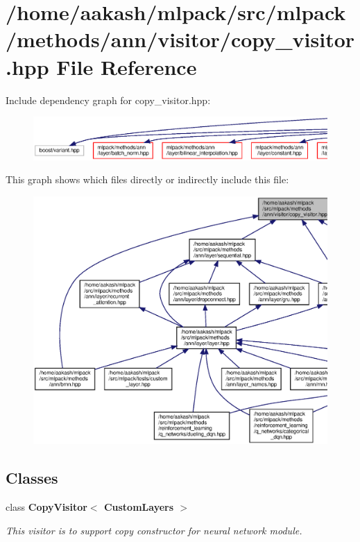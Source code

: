 \section{/home/aakash/mlpack/src/mlpack/methods/ann/visitor/copy\+\_\+visitor.hpp File Reference}
\label{copy__visitor_8hpp}
Include dependency graph for copy\+\_\+visitor.\+hpp\+:
\nopagebreak
\begin{figure}[H]
\begin{center}
\leavevmode
\includegraphics[width=350pt]{copy__visitor_8hpp__incl}
\end{center}
\end{figure}
This graph shows which files directly or indirectly include this file\+:
\nopagebreak
\begin{figure}[H]
\begin{center}
\leavevmode
\includegraphics[width=350pt]{copy__visitor_8hpp__dep__incl}
\end{center}
\end{figure}
\subsection*{Classes}
\begin{DoxyCompactItemize}
\item 
class \textbf{ Copy\+Visitor$<$ Custom\+Layers $>$}
\begin{DoxyCompactList}\small\item\em This visitor is to support copy constructor for neural network module. \end{DoxyCompactList}\end{DoxyCompactItemize}
